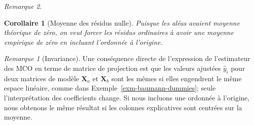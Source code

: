 \documentclass[
  11pt,
  letterpaper,
]{scrbook}
\theoremstyle{plain}
\theoremstyle{plain}
\newtheorem{corollary}{Corollaire}[chapter]
\theoremstyle{definition}
\theoremstyle{definition}
\theoremstyle{remark}
\newtheorem{refremark}{Remarque}[chapter]
\begin{document}
\begin{refremark}
\begin{corollary}[Moyenne des résidus
nulle]
Puisque les aléas avaient moyenne théorique de zéro, on veut forcer les
résidus ordinaires à avoir une moyenne empirique de zéro en incluant
l'ordonnée à l'origine.

\end{corollary}

\begin{refremark}[Invariance]
Une conséquence directe de l'expression de l'estimateur des MCO en terme
de matrice de projection est que les valeurs ajustées \(\widehat{y}_i\)
pour deux matrices de modèle \(\mathbf{X}_a\) et \(\mathbf{X}_b\) sont
les mêmes si elles engendrent le même espace linéaire, comme dans
Exemple~\ref{exm-baumann-dummies}; seule l'interprétation des
coefficients change. Si nous incluons une ordonnée à l'origine, nous
obtenons le même résultat si les colonnes explicatives sont centrées sur
la moyenne.


\end{refremark}
\end{refremark}
\end{document}
